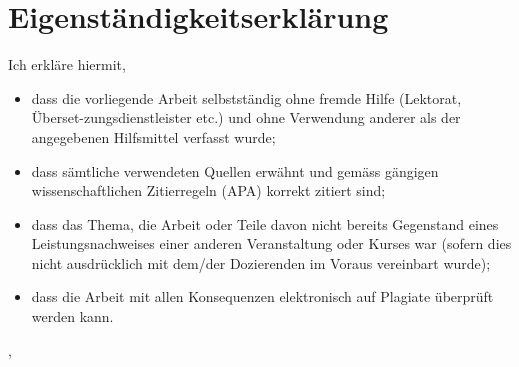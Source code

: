 \section*{Eigenständigkeitserklärung}
Ich erkläre hiermit,
\begin{itemize}
\item dass die vorliegende Arbeit selbstständig ohne fremde Hilfe (Lektorat, Überset-zungsdienstleister etc.) und ohne Verwendung anderer als der angegebenen Hilfsmittel verfasst wurde;
\item dass sämtliche verwendeten Quellen erwähnt und gemäss gängigen wissenschaftlichen Zitierregeln (APA) korrekt zitiert sind;
\item dass das Thema, die Arbeit oder Teile davon nicht bereits Gegenstand eines Leistungsnachweises einer anderen Veranstaltung oder Kurses war (sofern dies nicht ausdrücklich mit dem/der Dozierenden im Voraus vereinbart wurde);
\item dass die Arbeit mit allen Konsequenzen elektronisch auf Plagiate überprüft werden kann.
\end{itemize}
\vspace{1cm}
\hfill \theCity, \theDate
\\
\vspace{1.5cm}


\hfill \theAuthor
\thispagestyle{empty}
